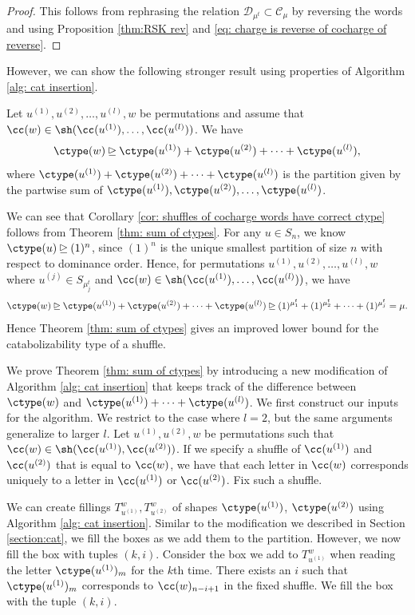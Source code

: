 \begin{proof}
This follows from rephrasing the relation $\mathcal{D}_{\mu^t} \subset \mathcal{C}_\mu$ by reversing the words and using Proposition \ref{thm:RSK rev} and \eqref{eq: charge is reverse of cocharge of reverse}.
\end{proof}
However, we can show the following stronger result using properties of Algorithm \ref{alg: cat insertion}.
\begin{thm2}\label{thm: sum of ctypes}
    Let $u^{(1)}, u^{(2)}, \dots, u^{(l)}, w$ be
    permutations and assume that $\cc(w) \in \sh(\cc(u^{(1)}),\dots, \cc(u^{(l)}))$.
    We have
    \[\ctype(w) \unrhd \ctype(u^{(1)}) + \ctype( u^{(2)}) + \cdots+ \ctype(u^{(l)}),\]
    where $\ctype(u^{(1)}) + \ctype( u^{(2)}) + \cdots +  \ctype(u^{(l)})$ is the partition given by the partwise sum of $\ctype(u^{(1)}),\ctype( u^{(2)}),\dots,\ctype(u^{(l)})$.
    \end{thm2}

We can see that Corollary \ref{cor: shuffles of cocharge words have correct ctype} follows from Theorem \ref{thm: sum of ctypes}. 
For any $u \in S_n$, we know $\ctype(u) \unrhd (1)^n$, since $(1)^{n}$ is the unique smallest partition of size $n$ with respect to dominance order. Hence, for permutations  $u^{(1)}, u^{(2)}, \dots, u^{(l)}, w$  where $u^{(j)}  \in S_{\mu^t_j}$ and $\cc(w) \in \sh(\cc(u^{(1)}),\dots, \cc(u^{(l)}))$, we have
\[\ctype(w) \unrhd \ctype(u^{(1)}) + \ctype( u^{(2)}) + \cdots+ \ctype(u^{(l)}) \unrhd (1)^{\mu^t_1} + (1)^{\mu^t_2} + \cdots + (1)^{\mu^t_j } = \mu.\]
Hence Theorem \ref{thm: sum of ctypes} gives an improved lower bound for the catabolizability type of a shuffle. 

We prove Theorem \ref{thm: sum of ctypes} by introducing a new modification of Algorithm \ref{alg: cat insertion} that keeps track of the difference between $\ctype(w)$ and $\ctype(u^{(1)}) +\cdots +\ctype(u^{(l)})$. 
We first construct our inputs for the algorithm. We restrict to the case where $l = 2$, but the same arguments generalize to larger $l.$
Let $u^{(1)}, u^{(2)},w$ be permutations such that $\cc(w)\in \sh(\cc(u^{(1)}),\cc(u^{(2)}))$. 
If we specify a shuffle of $\cc(u^{(1)})$ and $\cc(u^{(2)})$ that is equal to $\cc(w)$, we have that each letter in $\cc(w)$ corresponds uniquely to a letter in $\cc(u^{(1)})$ or $\cc(u^{(2)})$. Fix such a shuffle. 

We can create fillings $T^{w}_{u^{(1)}},T^w_{u^{(2)}}$ of shapes $\ctype(u^{(1)})$, $\ctype(u^{(2)})$ using Algorithm \ref{alg: cat insertion}. 
Similar to the modification we described in Section \ref{section:cat}, we fill the boxes as we add them to the partition. 
However, we now fill the box with tuples $(k,i)$. 
Consider the box we add to $T^{w}_{u^{(1)}}$ when reading the letter $\ctype(u^{(1)})_{m}$ for the $k$th time. There exists an $i$ such that $\ctype(u^{(1)})_{m}$ corresponds to $\cc(w)_{n-i+1}$ in the fixed shuffle. We fill the box with the tuple $(k,i)$. 

